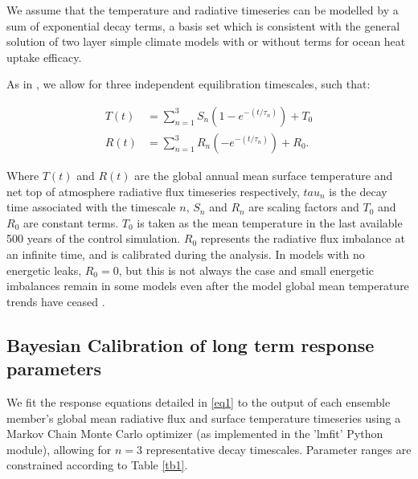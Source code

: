 \documentclass[esd, article]{copernicus}
\begin{document}
We assume that the temperature and radiative timeseries can be modelled by a sum of exponential decay terms, a basis set \cite{proistosescu2017slow,sanderson2020relating} which is consistent with the general solution of two layer simple climate models with \cite{geoffroy2013transient,winton2010importance,smith2018fair} or without \cite{geoffroy2013constant} terms for ocean heat uptake efficacy.  

As in \cite{proistosescu2017slow}, we allow for three independent equilibration timescales, such that:


\begin{align}
   T(t)&=\sum_{n=1}^3 S_n(1-e^{-(t/\tau_n)})+T_0\\
   R(t)&=\sum_{n=1}^3 R_n(-e^{-(t/\tau_n)})+R_0.
\label{eq1}
\end{align}

Where $T(t)$ and $R(t)$ are the global annual mean surface temperature and net top of atmosphere radiative flux timeseries respectively, $tau_n$ is the decay time associated with the timescale $n$, $S_n$ and $R_n$ are scaling factors and $T_0$ and $R_0$ are constant terms. $T_0$ is taken as the mean temperature in the last available 500 years of the control simulation.  $R_0$ represents the radiative flux imbalance at an infinite time, and is calibrated during the analysis.  In models with no energetic leaks, $R_0=0$, but this is not always the case and small energetic imbalances remain in some models even after the model global mean temperature trends have ceased \citep{rugenstein2019longrunmip}.

\subsection{Bayesian Calibration of long term response parameters}
We fit the response equations detailed in \ref{eq1} to the output of each ensemble member's global mean radiative flux and surface temperature timeseries using a Markov Chain Monte Carlo optimizer \cite{foreman2013emcee} (as implemented in the 'lmfit' Python module), allowing for $n=3$ representative decay timescales.  Parameter ranges are constrained according to Table \ref{tb1}.  
\end{document}
